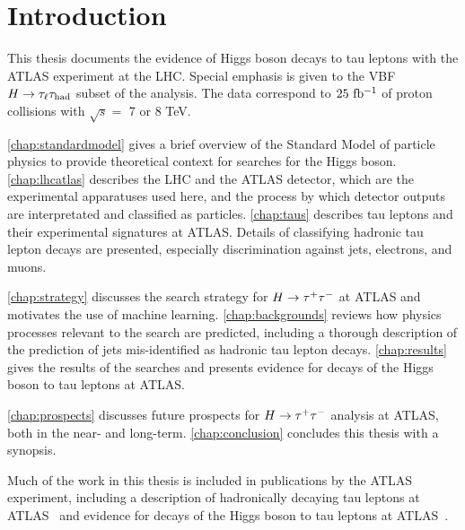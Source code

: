 \chapter[Introduction][Introduction]{Introduction}
\label{chap:introduction}

This thesis documents the evidence of Higgs boson decays to tau leptons with the ATLAS experiment at the LHC. Special emphasis is given to the VBF $H\rightarrow\tau_\ell\tau_\text{had}$ subset of the analysis. The data correspond to $25\ \ifb$ of proton collisions with $\sqrt{s} = $ 7 or 8 TeV.

\cref{chap:standardmodel} gives a brief overview of the Standard Model of particle physics to provide theoretical context for searches for the Higgs boson. \cref{chap:lhcatlas} describes the LHC and the ATLAS detector, which are the experimental apparatuses used here, and the process by which detector outputs are interpretated and classified as particles. \cref{chap:taus} describes tau leptons and their experimental signatures at ATLAS. Details of classifying hadronic tau lepton decays are presented, especially discrimination against jets, electrons, and muons.

\cref{chap:strategy} discusses the search strategy for ${H\rightarrow \tau^{+}\tau^{-}}$ at ATLAS and motivates the use of machine learning. \cref{chap:backgrounds} reviews how physics processes relevant to the search are predicted, including a thorough description of the prediction of jets mis-identified as hadronic tau lepton decays. \cref{chap:results} gives the results of the searches and presents evidence for decays of the Higgs boson to tau leptons at ATLAS.

\cref{chap:prospects} discusses future prospects for ${H\rightarrow \tau^{+}\tau^{-}}$ analysis at ATLAS, both in the near- and long-term. \cref{chap:conclusion} concludes this thesis with a synopsis.

Much of the work in this thesis is included in publications by the ATLAS experiment, including a description of hadronically decaying tau leptons at ATLAS~\cite{PERF-2013-06} and evidence for decays of the Higgs boson to tau leptons at ATLAS~\cite{HIGG-2013-32}.

